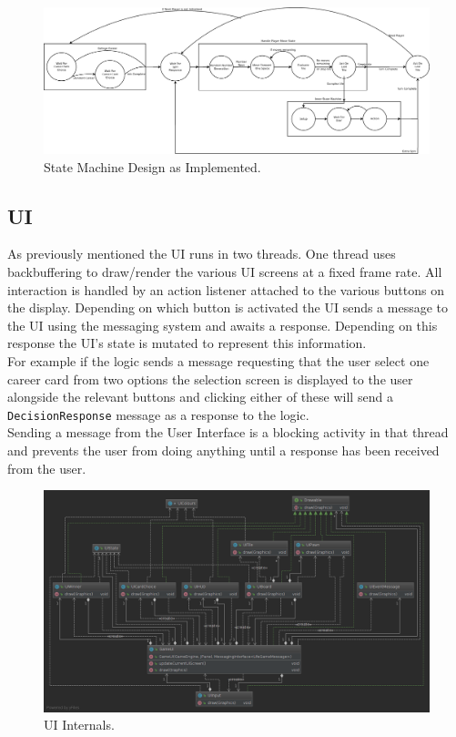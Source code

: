\documentclass[a4paper, 11pt]{article}
\begin{document}
	\begin{figure}[!h]
		\centering
		\includegraphics[scale=.1]{state_machine_high_level}
		\caption{State Machine Design as Implemented.}
		\label{fig:state_machine_actual}
	\end{figure}
	\subsection*{UI}
	As previously mentioned the UI runs in two threads. One thread uses backbuffering to draw/render the various UI screens at a fixed frame rate. All interaction is handled by an action listener attached to the various buttons on the display. Depending on which button is activated the UI sends a message to the UI using the messaging system and awaits a response. Depending on this response the UI's state is mutated to represent this information.\\
	For example if the logic sends a message requesting that the user select one career card from two options the selection screen is displayed to the user alongside the relevant buttons and clicking either of these will send a \texttt{DecisionResponse} message as a response to the logic.\\
	Sending a message from the User Interface is a blocking activity in that thread and prevents the user from doing anything until a response has been received from the user.
	\begin{figure}[!h]
		\centering
		\includegraphics[scale=.35]{uml/ui_uml}
		\caption{UI Internals.}
		\label{fig:ui_uml}
	\end{figure}
	
\end{document}
